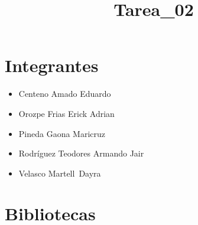 \documentclass[11pt]{article}
\title{Tarea\_02}
\providecommand{\tightlist}{%
      \setlength{\itemsep}{0pt}\setlength{\parskip}{0pt}}
\begin{document}
    
    \maketitle
    
    

    
    \hypertarget{integrantes}{%
\section{Integrantes}\label{integrantes}}

    \begin{itemize}
\tightlist
\item
  Centeno Amado Eduardo
\item
  Orozpe Frias Erick Adrian
\item
  Pineda Gaona Maricruz
\item
  Rodríguez Teodores Armando Jair
\item
  Velasco Martell~Dayra
\end{itemize}

    \hypertarget{bibliotecas}{%
\section{Bibliotecas}\label{bibliotecas}}
\end{document}
